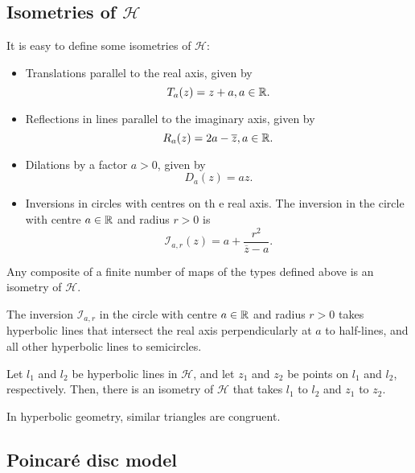 \subsection{Isometries of $\mathcal{H}$}

It is easy to define some isometries of $\mathcal{H}$:

\begin{itemize}
  \item Translations parallel to the real axis, given by
  \[
    T_a(z) = z + a, a \in \mathbb{R}.  
  \]
  \item Reflections in lines parallel to the imaginary axis, given by
  \[
    R_a(z) = 2a - \overline{z}, a \in \mathbb{R}.
  \]
  \item Dilations by a factor $a > 0$, given by
  \[
    D_a(z) = az.  
  \]
  \item Inversions in circles with centres on th e real axis.
  The inversion in the circle with centre $a \in \mathbb{R}$ and radius $r > 0$ is
  \[
    \mathcal{I}_{a, r}(z) = a + \frac{r^2}{\overline{z} - a}.
  \]
\end{itemize}

\begin{proposition}
  Any composite of a finite number of maps of the types defined above is an isometry of $\mathcal{H}$.
\end{proposition}

\begin{proposition}
  The inversion $\mathcal{I}_{a, r}$ in the circle with centre $a \in \mathbb{R}$ and radius $r > 0$
  takes hyperbolic lines that intersect the real axis perpendicularly at $a$ to half-lines,
  and all other hyperbolic lines to semicircles.
\end{proposition}

\begin{proposition}
  Let $l_1$ and $l_2$ be hyperbolic lines in $\mathcal{H}$, and let $z_1$ and $z_2$
  be points on $l_1$ and $l_2$, respectively.
  Then, there is an isometry of $\mathcal{H}$ that takes $l_1$ to $l_2$ and $z_1$ to $z_2$.
\end{proposition}

\begin{theorem}
  In hyperbolic geometry, similar triangles are congruent.
\end{theorem}

\subsection{Poincar\'e disc model}

